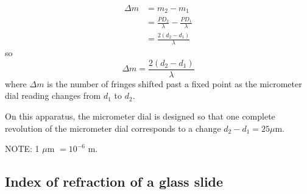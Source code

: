 \begin{align}
 \Delta m &= m_2 - m_1 \nonumber \\
 &= \frac{PD_{2}}{\lambda} - \frac{PD_{1}}{\lambda} \nonumber \\
 &= \frac{2(d_{2} - d_{1})} {\lambda} \nonumber
\end{align}
so
\begin{equation}
\boxed{\Delta m = \frac{2(d_{2} - d_{1})} {\lambda}}
\label{eq:delta-m}
\end{equation}
where $\Delta m$ is the number of fringes shifted past a fixed point as the micrometer 
dial reading changes from $d_{1}$ to $d_{2}$.

On this apparatus, the micrometer dial is designed so that one 
complete revolution of the micrometer dial corresponds to a change 
$d_{2} - d_{1} = 25 \mu$m.


NOTE: 1 $\mu$m $= 10^{-6}$ m.

%




\subsection{Index of refraction of a glass slide}

